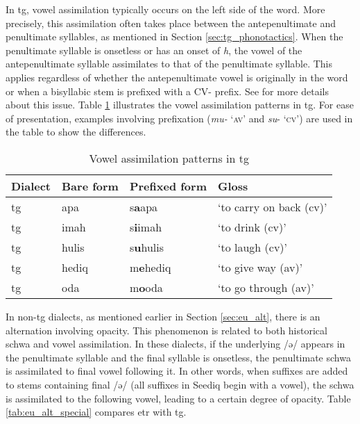 In \acl{tg}, vowel assimilation typically occurs on the left side of the word. More precisely, this assimilation often takes place between the antepenultimate and penultimate syllables, as mentioned in Section \ref{sec:tg_phonotactics}. When the penultimate syllable is onsetless or has an onset of \textit{h}, the vowel of the antepenultimate syllable assimilates to that of the penultimate syllable. This applies regardless of whether the antepenultimate vowel is originally in the word or when a bisyllabic stem is prefixed with a CV- prefix. See \textcite[666-673]{yang1976sedpho} for more details about this issue. Table \ref{tab:tg_vassim} illustrates the vowel assimilation patterns in \acl{tg}. For ease of presentation, examples involving prefixation (\textit{mu-} `\textsc{av}' and \textit{su}- `\textsc{cv}') are used in the table to show the differences.

\begin{table}[!htbp]
\centering
\caption{Vowel assimilation patterns in \acl{tg}}
\label{tab:tg_vassim}
\begin{tabular}{llll}
\hline
Dialect  & Bare form & Prefixed form & Gloss                       \\ \hline
\acl{tg} & apa       & s\textbf{a}apa         & `to carry on back (\acs{cv})' \\
\acl{tg} & imah      & s\textbf{i}imah        & `to drink (\acs{cv})'         \\
\acl{tg} & hulis     & s\textbf{u}hulis       & `to laugh (\acs{cv})'         \\
\acl{tg} & hediq     & m\textbf{e}hediq       & `to give way (\acs{av})'      \\
\acl{tg} & oda       & m\textbf{o}oda         & `to go through (\acs{av})'          \\ \hline
\end{tabular}
\end{table}

In non-\acl{tg} dialects, as mentioned earlier in Section \ref{sec:eu_alt}, there is an alternation involving opacity. This phenomenon is related to both historical schwa and vowel assimilation. In these dialects, if the underlying /ə/ appears in the penultimate syllable and the final syllable is onsetless, the penultimate schwa is assimilated to final vowel following it. In other words, when suffixes are added to stems containing final /ə/ (all suffixes in Seediq begin with a vowel), the schwa is assimilated to the following vowel, leading to a certain degree of opacity. Table \ref{tab:eu_alt_special} compares \acl{etr} with \acl{tg}.


